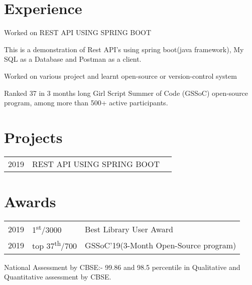 \documentclass[]{deedy-resume-openfont}
\begin{document}
\begin{minipage}[t]{0.66\textwidth} 


\section{Experience}
\sectionsep

\vspace{\topsep} %
\begin{tightemize}
\item Worked on REST API USING SPRING BOOT 
\item This is a demonstration of Rest API's using spring boot(java framework), My SQL as a Database and Postman as a client.
\end{tightemize}
\sectionsep

\begin{tightemize}
\item Worked on various project and learnt open-source or version-control system \item Ranked 37 in 3 months long Girl Script Summer of Code (GSSoC) open-source program, among more than 500+ active participants.
\end{tightemize}
\sectionsep



\section{Projects} 
\begin{tabular}{rll}
2019	     & REST API USING SPRING BOOT \\
\end{tabular}
\sectionsep


\section{Awards} 
\begin{tabular}{rll}
2019	     & 1\textsuperscript{st}/3000 & Best Library User Award \\
2019	     & top 37\textsuperscript{th}/700 & GSSoC'19(3-Month Open-Source program) \\
\end{tabular}
\item National Assessment by CBSE:- 99.86 and 98.5 percentile in Qualitative   and Quantitative assessment by CBSE.
\sectionsep


\end{minipage}
\end{document}
